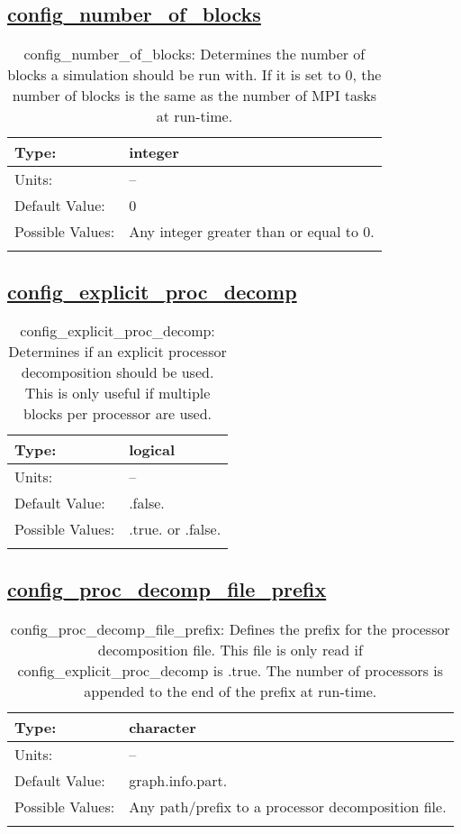 \subsection[config\_number\_of\_blocks]{\hyperref[sec:nm_tab_decomposition]{config\_number\_of\_blocks}}
\label{subsec:nm_sec_config_number_of_blocks}
\begin{center}
\begin{longtable}{| p{2.0in} || p{4.0in} |}
    \hline
    Type: & integer \\
    \hline
    Units: & -- \\
    \hline
    Default Value: & 0 \\
    \hline
    Possible Values: & Any integer greater than or equal to 0. \\
    \hline
    \caption{config\_number\_of\_blocks: Determines the number of blocks a simulation should be run with. If it is set to 0, the number of blocks is the same as the number of MPI tasks at run-time.}
\end{longtable}
\end{center}
\subsection[config\_explicit\_proc\_decomp]{\hyperref[sec:nm_tab_decomposition]{config\_explicit\_proc\_decomp}}
\label{subsec:nm_sec_config_explicit_proc_decomp}
\begin{center}
\begin{longtable}{| p{2.0in} || p{4.0in} |}
    \hline
    Type: & logical \\
    \hline
    Units: & -- \\
    \hline
    Default Value: & .false. \\
    \hline
    Possible Values: & .true. or .false. \\
    \hline
    \caption{config\_explicit\_proc\_decomp: Determines if an explicit processor decomposition should be used. This is only useful if multiple blocks per processor are used.}
\end{longtable}
\end{center}
\subsection[config\_proc\_decomp\_file\_prefix]{\hyperref[sec:nm_tab_decomposition]{config\_proc\_decomp\_file\_prefix}}
\label{subsec:nm_sec_config_proc_decomp_file_prefix}
\begin{center}
\begin{longtable}{| p{2.0in} || p{4.0in} |}
    \hline
    Type: & character \\
    \hline
    Units: & -- \\
    \hline
    Default Value: & graph.info.part. \\
    \hline
    Possible Values: & Any path/prefix to a processor decomposition file. \\
    \hline
    \caption{config\_proc\_decomp\_file\_prefix: Defines the prefix for the processor decomposition file. This file is only read if config\_explicit\_proc\_decomp is .true. The number of processors is appended to the end of the prefix at run-time.}
\end{longtable}
\end{center}
